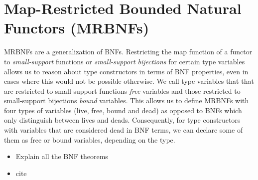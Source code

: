   \section{Map-Restricted Bounded Natural Functors (MRBNFs)}
    \acp{MRBNF} are a generalization of \acp{BNF}. Restricting the \textsf{map} function of a functor to \textit{small-support} functions or \textit{small-support bijections} for certain type variables allows us to reason about type constructors in terms of \ac{BNF} properties, even in cases where this would not be possible otherwise. We call type variables that that are restricted to small-support functions \textit{free} variables  and those restricted to small-support bijections \textit{bound} variables. This allows us to define \acp{MRBNF} with four types of variables (live, free, bound and dead) as opposed to \acp{BNF} which only distinguish between lives and deads. 
    Consequently, for type constructors with variables that are considered dead in \ac{BNF} terms, we can declare some of them as free or bound variables, depending on the type.

    
  \begin{itemize}
    \item Explain all the BNF theorems
    \item cite \cite{blanchette2019bindings}
  \end{itemize}

